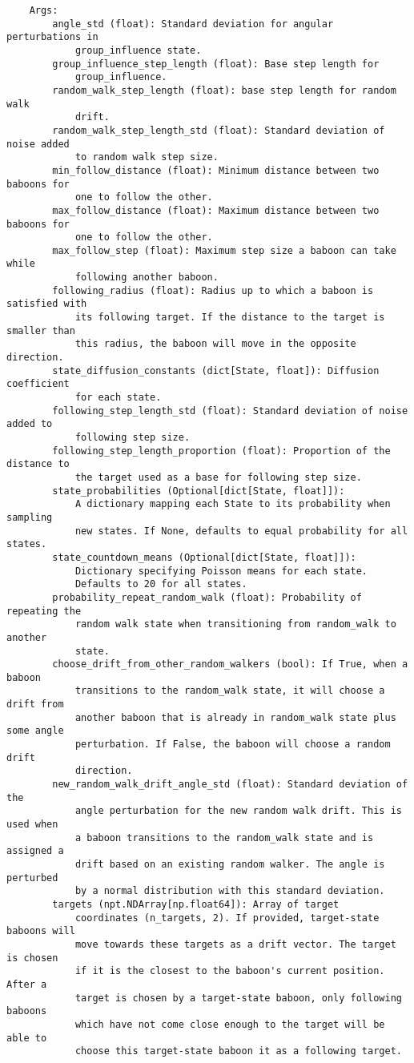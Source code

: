 \documentclass[
    article,
    oneside,
]{memoir}
\begin{document}
\begin{verbatim}
    Args:
        angle_std (float): Standard deviation for angular perturbations in
            group_influence state.
        group_influence_step_length (float): Base step length for
            group_influence.
        random_walk_step_length (float): base step length for random walk
            drift.
        random_walk_step_length_std (float): Standard deviation of noise added
            to random walk step size.
        min_follow_distance (float): Minimum distance between two baboons for
            one to follow the other.
        max_follow_distance (float): Maximum distance between two baboons for
            one to follow the other.
        max_follow_step (float): Maximum step size a baboon can take while
            following another baboon.
        following_radius (float): Radius up to which a baboon is satisfied with
            its following target. If the distance to the target is smaller than
            this radius, the baboon will move in the opposite direction.
        state_diffusion_constants (dict[State, float]): Diffusion coefficient
            for each state.
        following_step_length_std (float): Standard deviation of noise added to
            following step size.
        following_step_length_proportion (float): Proportion of the distance to
            the target used as a base for following step size.
        state_probabilities (Optional[dict[State, float]]):
            A dictionary mapping each State to its probability when sampling
            new states. If None, defaults to equal probability for all states.
        state_countdown_means (Optional[dict[State, float]]):
            Dictionary specifying Poisson means for each state.
            Defaults to 20 for all states.
        probability_repeat_random_walk (float): Probability of repeating the
            random walk state when transitioning from random_walk to another
            state.
        choose_drift_from_other_random_walkers (bool): If True, when a baboon
            transitions to the random_walk state, it will choose a drift from
            another baboon that is already in random_walk state plus some angle
            perturbation. If False, the baboon will choose a random drift
            direction.
        new_random_walk_drift_angle_std (float): Standard deviation of the
            angle perturbation for the new random walk drift. This is used when
            a baboon transitions to the random_walk state and is assigned a
            drift based on an existing random walker. The angle is perturbed
            by a normal distribution with this standard deviation.
        targets (npt.NDArray[np.float64]): Array of target
            coordinates (n_targets, 2). If provided, target-state baboons will
            move towards these targets as a drift vector. The target is chosen
            if it is the closest to the baboon's current position. After a
            target is chosen by a target-state baboon, only following baboons
            which have not come close enough to the target will be able to
            choose this target-state baboon it as a following target.


\end{verbatim}
\end{document}

